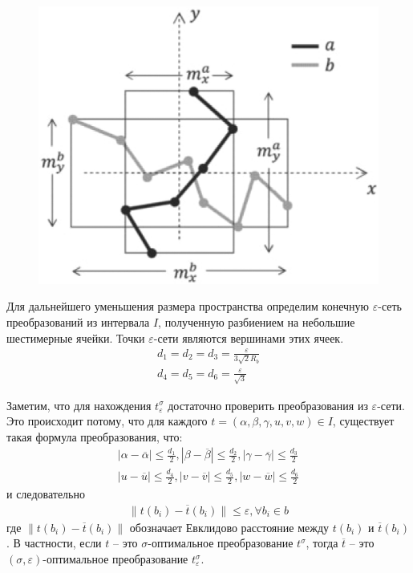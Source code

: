 \documentclass[a4paper]{extreport}
\newcommand{\eps}{\varepsilon}
\begin{document}
\begin{figure}
\caption{}
\includegraphics[scale=0.28]{../pictures/btp530f1.jpeg}
\end{figure}

Для дальнейшего уменьшения размера пространства определим конечную $\eps$-сеть преобразований из интервала $I$, полученную разбиением на небольшие шестимерные ячейки. Точки $\eps$-сети являются вершинами этих ячеек.
\begin{gather}
d_1 = d_2 = d_3 = \frac{\eps}{3\sqrt{2}R_b}\\
d_4 = d_5 = d_6 = \frac{\eps}{\sqrt{3}}
\end{gather}

Заметим, что для нахождения $t_\eps^\sigma$ достаточно проверить преобразования из $\eps$-сети. Это происходит потому, что для каждого $t=(\alpha, \beta, \gamma, u, v, w) \in I$, существует такая формула преобразования, что:
\begin{gather}
|\alpha - \overline{\alpha}| \leq \frac{d_1}{2}, |\beta - \overline{\beta}| \leq \frac{d_2}{2}, |\gamma - \overline{\gamma}| \leq \frac{d_3}{2}\\
|u - \overline{u}| \leq \frac{d_4}{2}, |v - \overline{v}| \leq \frac{d_5}{2}, |w - \overline{w}| \leq \frac{d_6}{2}
\end{gather}
и следовательно
\begin{gather}
\| t(b_i) - \overline{t}(b_i)\| \leq \eps, \forall b_i \in b
\end{gather}
где $\| t(b_i) - \overline{t}(b_i)\| $ обозначает Евклидово расстояние между $t(b_i)$ и $\overline{t}(b_i)$. В частности, если $t$ -- это $\sigma$-оптимальное преобразование $t^\sigma$, тогда $\overline{t}$ -- это $(\sigma, \eps)$-оптимальное преобразование $t_\eps^\sigma$.
\end{document}

